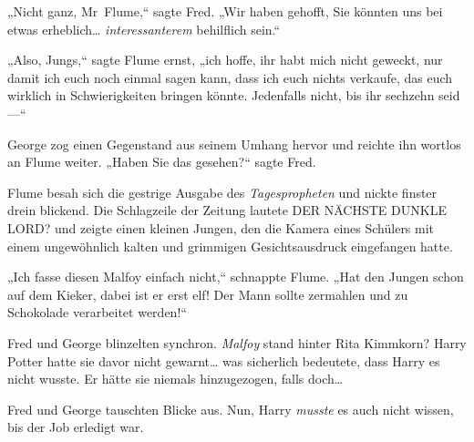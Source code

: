 „Nicht ganz, Mr~Flume,“ sagte Fred. „Wir haben gehofft, Sie könnten uns bei etwas erheblich… \emph{interessanterem} behilflich sein.“

„Also, Jungs,“ sagte Flume ernst, „ich hoffe, ihr habt mich nicht geweckt, nur damit ich euch noch einmal sagen kann, dass ich euch nichts verkaufe, das euch wirklich in Schwierigkeiten bringen könnte. Jedenfalls nicht, bis ihr sechzehn seid—“

George zog einen Gegenstand aus seinem Umhang hervor und reichte ihn wortlos an Flume weiter. „Haben Sie das gesehen?“ sagte Fred.

Flume besah sich die gestrige Ausgabe des \emph{Tagespropheten} und nickte finster drein blickend. Die Schlagzeile der Zeitung lautete DER NÄCHSTE DUNKLE LORD? und zeigte einen kleinen Jungen, den die Kamera eines Schülers mit einem ungewöhnlich kalten und grimmigen Gesichtsausdruck eingefangen hatte.

„Ich fasse diesen Malfoy einfach nicht,“ schnappte Flume. „Hat den Jungen schon auf dem Kieker, dabei ist er erst elf! Der Mann sollte zermahlen und zu Schokolade verarbeitet werden!“

Fred und George blinzelten synchron. \emph{Malfoy} stand hinter Rita Kimmkorn? Harry Potter hatte sie davor nicht gewarnt… was sicherlich bedeutete, dass Harry es nicht wusste. Er hätte sie niemals hinzugezogen, falls doch…

Fred und George tauschten Blicke aus. Nun, Harry \emph{musste} es auch nicht wissen, bis der Job erledigt war.

